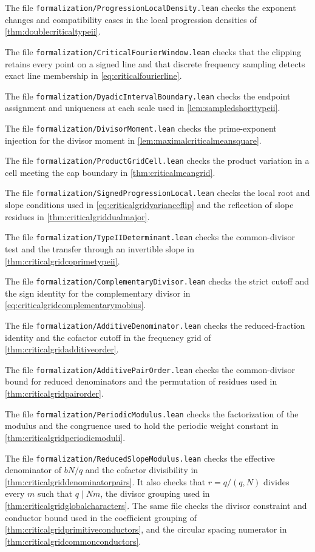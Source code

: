 \documentclass[11pt,a4paper]{article}
\numberwithin{equation}{section}
\begin{document}
The file \texttt{formalization/ProgressionLocalDensity.lean}
checks the exponent changes and compatibility cases in the
local progression densities of \cref{thm:doublecriticaltypeii}.

The file \texttt{formalization/CriticalFourierWindow.lean}
checks that the clipping retains every point on a signed
line and that discrete frequency sampling detects exact
line membership in \cref{eq:criticalfourierline}.

The file \texttt{formalization/DyadicIntervalBoundary.lean}
checks the endpoint assignment and uniqueness at each
scale used in \cref{lem:sampledshorttypeii}.

The file \texttt{formalization/DivisorMoment.lean}
checks the prime-exponent injection for the divisor
moment in \cref{lem:maximalcriticalmeansquare}.

The file \texttt{formalization/ProductGridCell.lean}
checks the product variation in a cell meeting the cap
boundary in \cref{thm:criticalmeangrid}.

The file \texttt{formalization/SignedProgressionLocal.lean}
checks the local root and slope conditions used in
\cref{eq:criticalgridvarianceflip} and the reflection
of slope residues in \cref{thm:criticalgriddualmajor}.

The file \texttt{formalization/TypeIIDeterminant.lean}
checks the common-divisor test and the transfer through
an invertible slope in \cref{thm:criticalgridcoprimetypeii}.

The file \texttt{formalization/ComplementaryDivisor.lean}
checks the strict cutoff and the sign identity for the
complementary divisor in \cref{eq:criticalgridcomplementarymobius}.

The file \texttt{formalization/AdditiveDenominator.lean}
checks the reduced-fraction identity and the cofactor cutoff
in the frequency grid of \cref{thm:criticalgridadditiveorder}.

The file \texttt{formalization/AdditivePairOrder.lean}
checks the common-divisor bound for reduced denominators and
the permutation of residues used in \cref{thm:criticalgridpairorder}.

The file \texttt{formalization/PeriodicModulus.lean}
checks the factorization of the modulus and the congruence
used to hold the periodic weight constant in
\cref{thm:criticalgridperiodicmoduli}.

The file \texttt{formalization/ReducedSlopeModulus.lean}
checks the effective denominator of $bN/q$ and the
cofactor divisibility in \cref{thm:criticalgriddenominatorpairs}.
It also checks that $r=q/(q,N)$ divides every $m$ such that
$q\mid Nm$, the divisor grouping used in
\cref{thm:criticalgridglobalcharacters}. The same file checks
the divisor constraint and conductor bound used in the
coefficient grouping of \cref{thm:criticalgridprimitiveconductors},
and the circular spacing numerator in
\cref{thm:criticalgridcommonconductors}.
\end{document}
